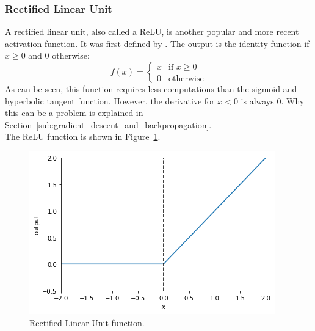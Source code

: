 \subsubsection{Rectified Linear Unit} %
\label{ssub:rectified_linear_unit}
A rectified linear unit, also called a ReLU, is another popular and more recent activation function. It was first defined by \cite{conf/icml/NairH10}. The output is the identity function if $x \ge 0$ and $0$ otherwise:
\begin{equation}
    f(x) = \begin{cases}
        x & \text{if $x \ge 0$}\\
        0 & \text{otherwise}
        \end{cases}
\end{equation}
As can be seen, this function requires less computations than the sigmoid and hyperbolic tangent function. However, the derivative for $x<0$ is always $0$. Why this can be a problem is explained in Section~\ref{sub:gradient_descent_and_backpropagation}.\\
The ReLU function is shown in Figure~\ref{fig:relu}.
\begin{figure}[htb]
    \centering
    \includegraphics[width=.8\linewidth]{images/activation_functions/relu.png}
    \caption[Rectified Linear Unit function]{Rectified Linear Unit function.}
    \label{fig:relu}
\end{figure}

